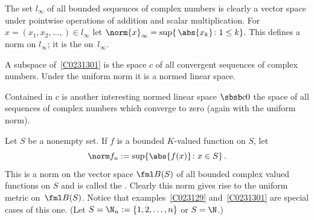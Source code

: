 \begin{exam}\label{C0231301} The set $l_\infty$ of all bounded sequences of complex numbers is
clearly a vector space under pointwise operations of addition and scalar multiplication.
For $x = (x_1,x_2,\dots,) \in l_\infty$ let
$\norm{x}_\infty = \sup\{\,\abs{x_k} \colon 1 \le k\}$.  This defines a norm on
$l_\infty$; it is the
 on~$l_\infty$.
\end{exam}

\begin{exam}\label{C0231302} A subspace of~\ref{C0231301} is the space $c$ of all convergent 
sequences of complex numbers.  Under the uniform norm it is a normed linear space.
\end{exam}

\begin{exam}\label{C0231303} Contained in $c$ is another interesting normed linear space $\sbsb c0$
the space of all sequences of complex numbers which converge to zero (again with the uniform norm).
\end{exam}

\begin{exam}\label{C023131}  Let $S$ be a nonempty set.  If $f$ is a bounded $K$-valued function on $S$, let
  \[ \norm f_u := \sup\{\abs{f(x)} \colon x \in S\}\,. \]
This is a norm on the vector space $\fml B(S)$ of all bounded complex valued functions on $S$ and is called the
.  Clearly this norm gives rise to the uniform metric on~$\fml B(S)$.
Notice that examples~\ref{C023129} and~\ref{C0231301} are
special cases of this one. (Let $S = \N_n := \{1,2,\dots,n\}$ or $S = \N$.)
\end{exam}











